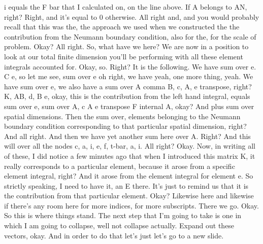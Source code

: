 \documentclass[10pt]{article}
\begin{document}
i equals the F bar that I calculated on, on the line above. If A belongs to AN, right? Right, and it's equal to 0 otherwise. All right and, and you would probably recall that this was the, the approach we used when we constructed the the contribution from the Neumann boundary condition, also for the, for the scale of problem. Okay? All right. So, what have we here? We are now in a position to look at our total finite dimension you'll be performing with all these element integrals accounted for. Okay, so.  Right? It is the following. We have sum over e. C e, so let me see, sum over e oh right, we have yeah, one more thing, yeah. We have sum over e, we also have a sum over A comma B, c, A, e transpose, right? K, AB, d, B e, okay, this is the contribution from the left hand integral, equals sum over e, sum over A, c A e transpose F internal A, okay? And plus sum over spatial dimensions. Then the sum over, elements belonging to the Neumann boundary condition corresponding to that particular spatial dimension, right? And all right. And then we have yet another sum here over A. Right? And this will over all the nodes c, a, i, e, f, t-bar, a, i. All right? Okay. Now, in writing all of these, I did notice a few minutes ago that when I introduced this matrix K, it really corresponds to a particular element, because it arose from a specific element integral, right? And it arose from the element integral for element e. So strictly speaking, I need to have it, an E there. It's just to remind us that it is the contribution from that particular element. Okay? Likewise here and likewise if there's any room here for more indices, for more subscripts. There we go. Okay. So this is where things stand. The next step that I'm going to take is one in which I am going to collapse, well not collapse actually. Expand out these vectors, okay. And in order to do that let's just let's go to a new slide.
\end{document}
